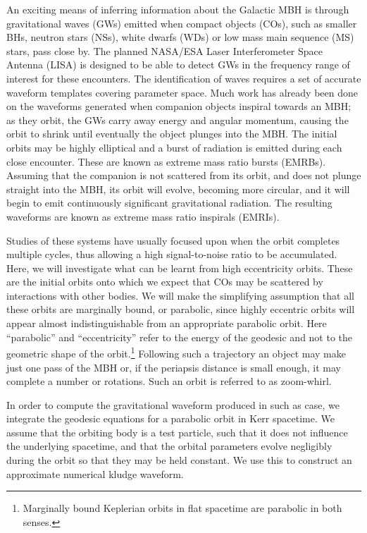 \documentclass[a4paper, 11pt, titlepage, twoside]{report}
\begin{document}
An exciting means of inferring information about the Galactic MBH is through gravitational waves (GWs) emitted when compact objects (COs), such as smaller BHs, neutron stars (NSs), white dwarfs (WDs) or low mass main sequence (MS) stars, pass close by. The planned NASA/ESA Laser Interferometer Space Antenna (LISA) is designed to be able to detect GWs in the frequency range of interest for these encounters\cite{Bender1998, Danzmann2003}. The identification of waves requires a set of accurate waveform templates covering parameter space. Much work has already been done on the waveforms generated when companion objects inspiral towards an MBH; as they orbit, the GWs carry away energy and angular momentum, causing the orbit to shrink until eventually the object plunges into the MBH. The initial orbits may be highly elliptical and a burst of radiation is emitted during each close encounter. These are known as extreme mass ratio bursts (EMRBs)\cite{Rubbo2006}. Assuming that the companion is not scattered from its orbit, and does not plunge straight into the MBH, its orbit will evolve, becoming more circular, and it will begin to emit continuously significant gravitational radiation. The resulting waveforms are known as extreme mass ratio inspirals (EMRIs).

Studies of these systems have usually focused upon when the orbit completes multiple cycles, thus allowing a high signal-to-noise ratio to be accumulated. Here, we will investigate what can be learnt from high eccentricity orbits. These are the initial orbits onto which we expect that COs may be scattered by interactions with other bodies. We will make the simplifying assumption that all these orbits are marginally bound, or parabolic, since highly eccentric orbits will appear almost indistinguishable from an appropriate parabolic orbit\cite{Kobayashi2004}. Here ``parabolic'' and ``eccentricity'' refer to the energy of the geodesic and not to the geometric shape of the orbit.\footnote{Marginally bound Keplerian orbits in flat spacetime are parabolic in both senses.} Following such a trajectory an object may make just one pass of the MBH or, if the periapsis distance is small enough, it may complete a number or rotations. Such an orbit is referred to as zoom-whirl.

In order to compute the gravitational waveform produced in such as case, we integrate the geodesic equations for a parabolic orbit in Kerr spacetime. We assume that the orbiting body is a test particle, such that it does not influence the underlying spacetime, and that the orbital parameters evolve negligibly during the orbit so that they may be held constant. We use this to construct an approximate numerical kludge waveform\cite{Babak2007}.
\end{document}
